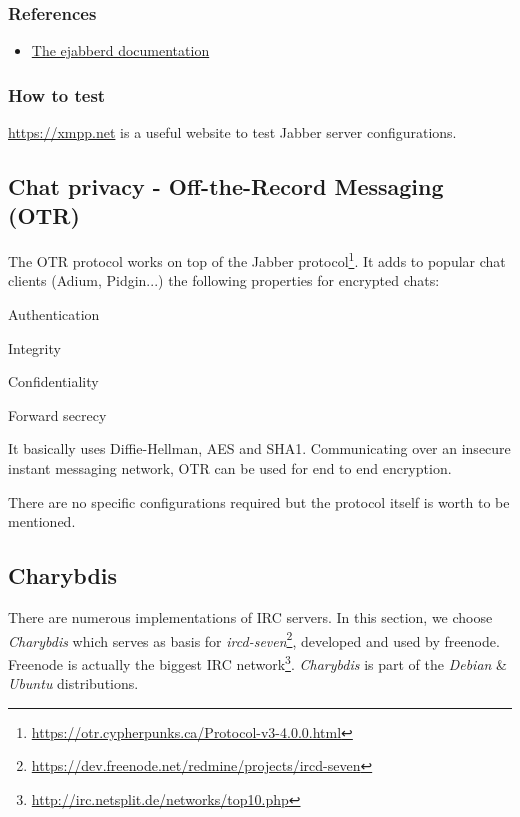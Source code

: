 \subsubsection{References}

\begin{itemize}
\item \href{http://www.process-one.net/en/ejabberd/docs/}{The ejabberd documentation}
\end{itemize}


\subsubsection{How to test}
\begin{itemize*}
  \item \url{https://xmpp.net} is a useful website to test Jabber server configurations.
\end{itemize*}


\subsection{Chat privacy - Off-the-Record Messaging (OTR)}

The OTR protocol works on top of the Jabber protocol\footnote{\url{https://otr.cypherpunks.ca/Protocol-v3-4.0.0.html}}.  
It adds to popular chat clients (Adium, Pidgin...) the following properties for encrypted chats:
\begin{itemize*}
  \item Authentication
  \item Integrity
  \item Confidentiality
  \item Forward secrecy
\end{itemize*}

It basically uses Diffie-Hellman, AES and SHA1. Communicating over an insecure instant messaging network, OTR can be used for end to end encryption.

There are no specific configurations required but the protocol itself is worth to be mentioned.


\subsection{Charybdis}
There are numerous implementations of IRC servers.  In this section, we choose \emph{Charybdis} which serves as basis for \emph{ircd-seven}\footnote{\url{https://dev.freenode.net/redmine/projects/ircd-seven}}, developed and used by freenode. Freenode is actually the biggest IRC network\footnote{\url{http://irc.netsplit.de/networks/top10.php}}. \emph{Charybdis} is part of the \emph{Debian} \& \emph{Ubuntu} distributions.


